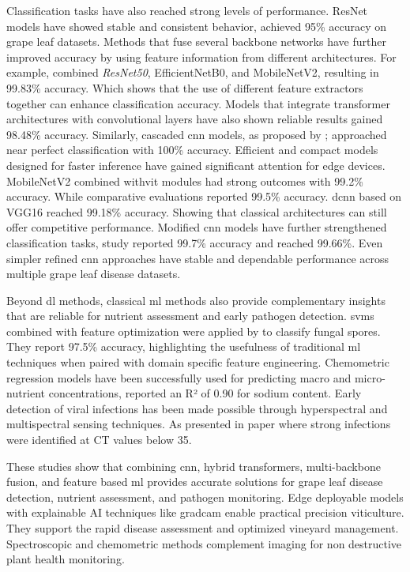 \documentclass[conference]{IEEEtran}
\begin{document}
Classification tasks have also reached strong levels of performance. ResNet models have showed stable and consistent behavior, \cite{Sagar2025} achieved 95\% accuracy on grape leaf datasets. Methods that fuse several backbone networks have further improved accuracy by using feature information from different architectures. For example, \cite{Vo2026AFCNet} combined \textit{ResNet50}, EfficientNetB0, and MobileNetV2, resulting in 99.83\% accuracy. Which shows that the use of different feature extractors together can enhance classification accuracy. Models that integrate transformer architectures with convolutional layers have also shown reliable results \cite{Zhang2025Transformer} gained 98.48\% accuracy. Similarly, cascaded \ac{cnn} models, as proposed by \cite{AlNasseri2025}; approached near perfect classification with 100\% accuracy. Efficient and compact models designed for faster inference have gained significant attention for edge devices. MobileNetV2 combined with\ac{vit} modules \cite{Tanvir2025} had strong outcomes with 99.2\% accuracy. While comparative evaluations \cite{Mathew2025} reported 99.5\% accuracy. \ac{dcnn} based on VGG16 \cite{Prasad2024} reached 99.18\% accuracy. Showing that classical architectures can still offer competitive performance. Modified \ac{cnn} models have further strengthened classification tasks, study \cite{Talaat2025} reported 99.7\% accuracy and \cite{Karim2024} reached 99.66\%. Even simpler refined \ac{cnn} approaches \cite{Naik2025} have stable and dependable performance across multiple grape leaf disease datasets.

Beyond \ac{dl} methods, classical \ac{ml} methods also provide complementary insights that are reliable for nutrient assessment and early pathogen detection. \ac{svm}s combined with feature optimization  were applied by \cite{Shi2025} to classify fungal spores. They report 97.5\% accuracy, highlighting the usefulness of traditional \ac{ml} techniques when paired with domain specific feature engineering. Chemometric regression models have been successfully used for predicting macro and micro-nutrient concentrations, \cite{Manzano2025} reported an R² of 0.90 for sodium content. Early detection of viral infections has been made possible through hyperspectral and multispectral sensing techniques. As presented in paper \cite{Lee2024} where strong infections were identified at CT values below 35.

These studies show that combining \ac{cnn}, hybrid transformers, multi-backbone fusion, and feature based \ac{ml} provides accurate solutions for grape leaf disease detection, nutrient assessment, and pathogen monitoring. Edge deployable models with explainable AI techniques like \ac{gradcam} enable practical precision viticulture. They support the rapid disease assessment and optimized vineyard management. Spectroscopic and chemometric methods complement imaging for non destructive plant health monitoring.
\end{document}
